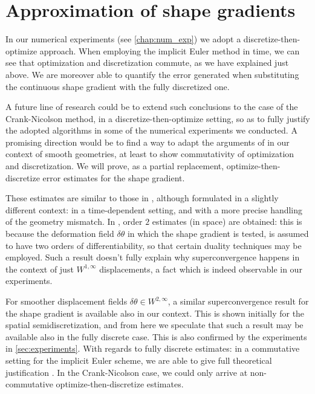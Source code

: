 \documentclass[english,a4paper,9pt,oneside]{scrbook}	%
\theoremstyle{break}
\theoremstyle{remark}
\newcommand{\te}{\theta}
\begin{document}
\section{Approximation of shape gradients}
\label{sec:d-t-o_IE}

In our numerical experiments (see \cref{chap:num_exp}) we adopt a discretize-then-optimize approach. When employing the implicit Euler method in time, we can see that optimization and discretization commute, as we have explained just above. We are moreover able to quantify the error generated when substituting the continuous shape gradient with the fully discretized one. 

A future line of research could be to extend such conclusions to the case of the Crank-Nicolson method, in a discretize-then-optimize setting, so as to fully justify the adopted algorithms in some of the numerical experiments we conducted. A promising direction would be to find a way to adapt the arguments of \cite{flaig} in our context of smooth geometries, at least to show commutativity of optimization and discretization. We will prove, as a partial replacement, optimize-then-discretize error estimates for the shape gradient.

These estimates are similar to those in \cite{paganini}, although formulated in a slightly different context: in a time-dependent setting, and with a more precise handling of the geometry mismatch. In \cite{paganini}, order $2$ estimates (in space) are obtained: this is because the deformation field $\delta \te$  in which the shape gradient is tested, is assumed to have two orders of differentiability, so that certain duality techniques may be employed. Such a result doesn't fully explain why superconvergence happens in the context of just $W^{1,\infty}$ displacements, a fact which is indeed observable in our experiments.

For smoother displacement fields $\delta \te\in W^{2,\infty}$, a similar superconvergence result for the shape gradient is available also in our context. This is shown initially for the spatial semidiscretization, and from here we speculate that such a result may be available also in the fully discrete case. This is also confirmed by the experiments in \cref{sec:experiments}. With regards to fully discrete estimates: in a commutative setting for the implicit Euler scheme, we are able to give full theoretical justification . In the Crank-Nicolson case, we could only arrive at non-commutative optimize-then-discretize estimates.
\end{document}
